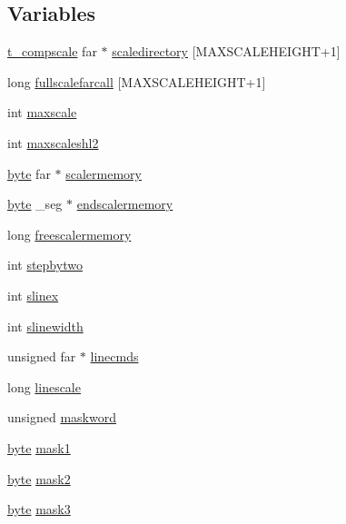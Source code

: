 \subsection*{Variables}
\begin{DoxyCompactItemize}
\item 
\hyperlink{structt__compscale}{t\_\-compscale} far $\ast$ \hyperlink{CONTIGSC_8C_aef72729fea30b6e44686fff7019cef9f}{scaledirectory} \mbox{[}MAXSCALEHEIGHT+1\mbox{]}
\item 
long \hyperlink{CONTIGSC_8C_a4b3db832e1c51c7a13e5e973de3115b3}{fullscalefarcall} \mbox{[}MAXSCALEHEIGHT+1\mbox{]}
\item 
int \hyperlink{CONTIGSC_8C_a4531e3adda9a00231c5fc8b7a4644398}{maxscale}
\item 
int \hyperlink{CONTIGSC_8C_ac10b61c2a588ba00d9ecda54429e0a9d}{maxscaleshl2}
\item 
\hyperlink{ID__HEAD_8H_a0c8186d9b9b7880309c27230bbb5e69d}{byte} far $\ast$ \hyperlink{CONTIGSC_8C_aaf286380af29be7798468a08b72ceb01}{scalermemory}
\item 
\hyperlink{ID__HEAD_8H_a0c8186d9b9b7880309c27230bbb5e69d}{byte} \_\-seg $\ast$ \hyperlink{CONTIGSC_8C_acc8981c41b0a6cb0db5f2703f83ab50e}{endscalermemory}
\item 
long \hyperlink{CONTIGSC_8C_a5ae0a742f3010ac7cec93d2a7046ad7c}{freescalermemory}
\item 
int \hyperlink{CONTIGSC_8C_aa80a217b0adae9ee21e078108c9ef3c5}{stepbytwo}
\item 
int \hyperlink{CONTIGSC_8C_aaec68c7e7f5e78b99df5b9ed716b35d2}{slinex}
\item 
int \hyperlink{CONTIGSC_8C_abd65d74dcd32e5501a3ecec638d65b0e}{slinewidth}
\item 
unsigned far $\ast$ \hyperlink{CONTIGSC_8C_a1f5a9f548c7a29c13b62f5fdc2a24ea8}{linecmds}
\item 
long \hyperlink{CONTIGSC_8C_ab632e78b4009b275cfa1629ac26b4be1}{linescale}
\item 
unsigned \hyperlink{CONTIGSC_8C_a6ccb606fa584e073646279771b40a0ee}{maskword}
\item 
\hyperlink{ID__HEAD_8H_a0c8186d9b9b7880309c27230bbb5e69d}{byte} \hyperlink{CONTIGSC_8C_a522ae19258cf30475ed90bb76819efb1}{mask1}
\item 
\hyperlink{ID__HEAD_8H_a0c8186d9b9b7880309c27230bbb5e69d}{byte} \hyperlink{CONTIGSC_8C_adadec9ebf5f6fe80150d567aa14fb9df}{mask2}
\item 
\hyperlink{ID__HEAD_8H_a0c8186d9b9b7880309c27230bbb5e69d}{byte} \hyperlink{CONTIGSC_8C_a2cf11bafb2cecc45d9388a79b54483b7}{mask3}

\end{DoxyCompactItemize}
